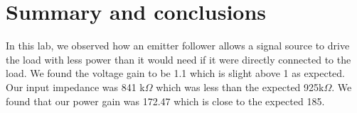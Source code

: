 \documentclass[11pt,letterpaper,onecolumn]{article}
\begin{document}
\section{Summary and conclusions}

In this lab, we observed how an emitter follower allows a signal source to drive the load with less power than it would need if it were directly connected to the load. We found the voltage gain to be 1.1 which is slight above 1 as expected. Our input impedance was 841 k$\Omega$ which was less than the expected 925k$\Omega$. We found that our power gain was 172.47 which is close to the expected 185.




\end{document}
